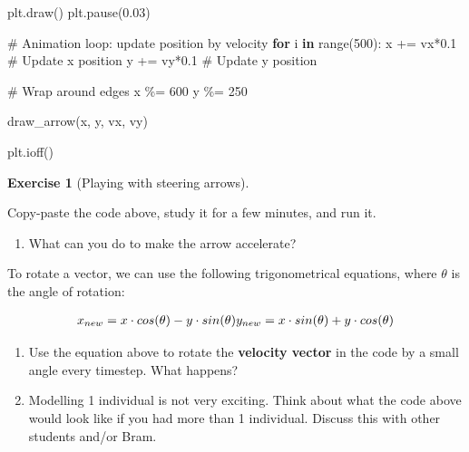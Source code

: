 \documentclass[
  letterpaper,
  DIV=11,
  numbers=noendperiod]{scrreprt}
\newenvironment{Shaded}{\begin{snugshade}}{\end{snugshade}}
\newcommand{\BuiltInTok}[1]{\textcolor[rgb]{0.00,0.23,0.31}{#1}}
\newcommand{\CommentTok}[1]{\textcolor[rgb]{0.37,0.37,0.37}{#1}}
\newcommand{\ControlFlowTok}[1]{\textcolor[rgb]{0.00,0.23,0.31}{\textbf{#1}}}
\newcommand{\DecValTok}[1]{\textcolor[rgb]{0.68,0.00,0.00}{#1}}
\newcommand{\FloatTok}[1]{\textcolor[rgb]{0.68,0.00,0.00}{#1}}
\newcommand{\KeywordTok}[1]{\textcolor[rgb]{0.00,0.23,0.31}{\textbf{#1}}}
\newcommand{\NormalTok}[1]{\textcolor[rgb]{0.00,0.23,0.31}{#1}}
\newcommand{\OperatorTok}[1]{\textcolor[rgb]{0.37,0.37,0.37}{#1}}
\providecommand{\tightlist}{%
  \setlength{\itemsep}{0pt}\setlength{\parskip}{0pt}}\usepackage{longtable,booktabs,array}
\theoremstyle{definition}
\newtheorem{exercise}{Exercise}[chapter]
\theoremstyle{remark}
\begin{document}
\begin{tcolorbox}
\begin{Shaded}
\begin{Highlighting}[]
\NormalTok{    plt.draw()}
\NormalTok{    plt.pause(}\FloatTok{0.03}\NormalTok{)}

\CommentTok{\# Animation loop: update position by velocity}
\ControlFlowTok{for}\NormalTok{ i }\KeywordTok{in} \BuiltInTok{range}\NormalTok{(}\DecValTok{500}\NormalTok{):}
\NormalTok{    x }\OperatorTok{+=}\NormalTok{ vx}\OperatorTok{*}\FloatTok{0.1}  \CommentTok{\# Update x position}
\NormalTok{    y }\OperatorTok{+=}\NormalTok{ vy}\OperatorTok{*}\FloatTok{0.1}  \CommentTok{\# Update y position}

    \CommentTok{\# Wrap around edges}
\NormalTok{    x }\OperatorTok{\%=} \DecValTok{600}
\NormalTok{    y }\OperatorTok{\%=} \DecValTok{250}
    
\NormalTok{    draw\_arrow(x, y, vx, vy)}

\NormalTok{plt.ioff()}
\end{Highlighting}
\end{Shaded}

\end{tcolorbox}

\begin{exercise}[Playing with steering
arrows]\protect\hypertarget{exr-steering}{}\label{exr-steering}

Copy-paste the code above, study it for a few minutes, and run it.

\begin{enumerate}
\def\labelenumi{\alph{enumi}.}
\tightlist
\item
  What can you do to make the arrow accelerate?
\end{enumerate}

To rotate a vector, we can use the following trigonometrical equations,
where \(\theta\) is the angle of rotation:

\[
\begin{aligned}
x_{new} = x \cdot cos(\theta) - y \cdot sin(\theta) \newline
y_{new} = x \cdot sin(\theta) + y \cdot cos(\theta)
\end{aligned}
\]

\begin{enumerate}
\def\labelenumi{\alph{enumi}.}
\setcounter{enumi}{1}
\tightlist
\item
  Use the equation above to rotate the \textbf{velocity vector} in the
  code by a small angle every timestep. What happens?
\item
  Modelling 1 individual is not very exciting. Think about what the code
  above would look like if you had more than 1 individual. Discuss this
  with other students and/or Bram.
\end{enumerate}

\end{exercise}
\end{document}
